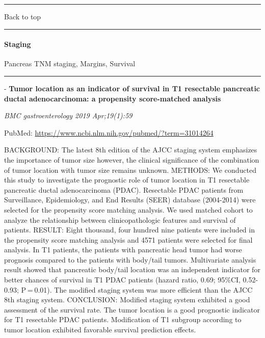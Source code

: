 \documentclass[]{article}
\let\oldparagraph\paragraph
\renewcommand{\paragraph}[1]{\oldparagraph{#1}\mbox{}}
\begin{document}
{}

\begin{center}\rule{0.5\linewidth}{\linethickness}\end{center}

Back to top

\begin{center}\rule{0.5\linewidth}{\linethickness}\end{center}

\pagebreak

\hypertarget{staging}{%
\paragraph{Staging}\label{staging}}

Pancreas TNM staging, Margins, Survival

\begin{center}\rule{0.5\linewidth}{\linethickness}\end{center}

 - \textbf{Tumor location as an indicator of survival in T1 resectable
pancreatic ductal adenocarcinoma: a propensity score-matched analysis}

\emph{BMC gastroenterology 2019 Apr;19(1):59}

PubMed: \url{https://www.ncbi.nlm.nih.gov/pubmed/?term=31014264}

BACKGROUND: The latest 8th edition of the AJCC staging system emphasizes
the importance of tumor size however, the clinical significance of the
combination of tumor location with tumor size remains unknown. METHODS:
We conducted this study to investigate the prognostic role of tumor
location in T1 resectable pancreatic ductal adenocarcinoma (PDAC).
Resectable PDAC patients from Surveillance, Epidemiology, and End
Results (SEER) database (2004-2014) were selected for the propensity
score matching analysis. We used matched cohort to analyze the
relationship between clinicopathologic features and survival of
patients. RESULT: Eight thousand, four hundred nine patients were
included in the propensity score matching analysis and 4571 patients
were selected for final analysis. In T1 patients, the patients with
pancreatic head tumor had worse prognosis compared to the patients with
body/tail tumors. Multivariate analysis result showed that pancreatic
body/tail location was an independent indicator for better chances of
survival in T1 PDAC patients (hazard ratio, 0.69; 95\%CI, 0.52-0.93;
P = 0.01). The modified staging system was more efficient than the AJCC
8th staging system. CONCLUSION: Modified staging system exhibited a good
assessment of the survival rate. The tumor location is a good prognostic
indicator for T1 resectable PDAC patients. Modification of T1 subgroup
according to tumor location exhibited favorable survival prediction
effects.
\end{document}
